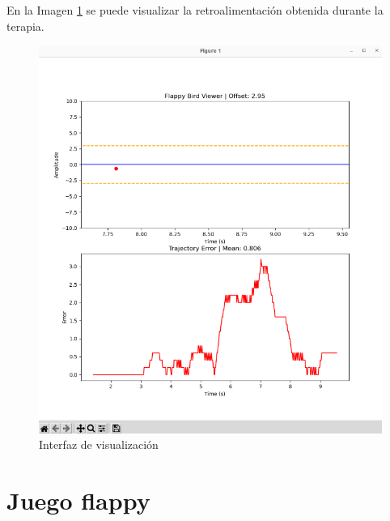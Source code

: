 En la Imagen \ref{fig:visual} se puede visualizar la retroalimentación obtenida durante la terapia.

\begin{figure}[ht!]
	\centering
	\begin{minipage}{0.85\linewidth}
		\centering
		\includegraphics[width=\linewidth]{figs/visual.png}
	\end{minipage}
	\caption[Interfaz de visualización]{Interfaz de visualización}
	\label{fig:visual}
\end{figure}

\section{Juego flappy}
